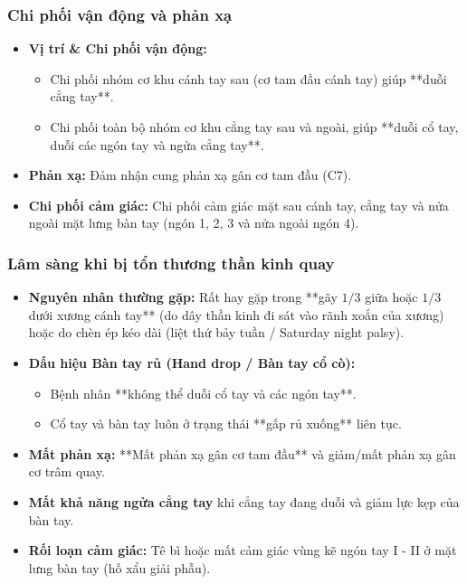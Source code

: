 \subsubsection{Chi phối vận động và phản xạ}
\begin{itemize}
    \item \textbf{Vị trí \& Chi phối vận động:} 
    \begin{itemize}
        \item Chi phối nhóm cơ khu cánh tay sau (cơ tam đầu cánh tay) giúp **duỗi cẳng tay**.
        \item Chi phối toàn bộ nhóm cơ khu cẳng tay sau và ngoài, giúp **duỗi cổ tay, duỗi các ngón tay và ngửa cẳng tay**.
    \end{itemize}
    \item \textbf{Phản xạ:} Đảm nhận cung phản xạ gân cơ tam đầu (C7).
    \item \textbf{Chi phối cảm giác:} Chi phối cảm giác mặt sau cánh tay, cẳng tay và nửa ngoài mặt lưng bàn tay (ngón 1, 2, 3 và nửa ngoài ngón 4).
\end{itemize}

\subsubsection{Lâm sàng khi bị tổn thương thần kinh quay}
\begin{itemize}
    \item \textbf{Nguyên nhân thường gặp:} Rất hay gặp trong **gãy $1/3$ giữa hoặc $1/3$ dưới xương cánh tay** (do dây thần kinh đi sát vào rãnh xoắn của xương) hoặc do chèn ép kéo dài (liệt thứ bảy tuần / Saturday night palsy).
    \item \textbf{Dấu hiệu Bàn tay rủ (Hand drop / Bàn tay cổ cò):}
    \begin{itemize}
        \item Bệnh nhân **không thể duỗi cổ tay và các ngón tay**.
        \item Cổ tay và bàn tay luôn ở trạng thái **gấp rủ xuống** liên tục.
    \end{itemize}
    \item \textbf{Mất phản xạ:} **Mất phản xạ gân cơ tam đầu** và giảm/mất phản xạ gân cơ trâm quay.
    \item \textbf{Mất khả năng ngửa cẳng tay} khi cẳng tay đang duỗi và giảm lực kẹp của bàn tay.
    \item \textbf{Rối loạn cảm giác:} Tê bì hoặc mất cảm giác vùng kẽ ngón tay I - II ở mặt lưng bàn tay (hố xẩu giải phẫu).
\end{itemize}

